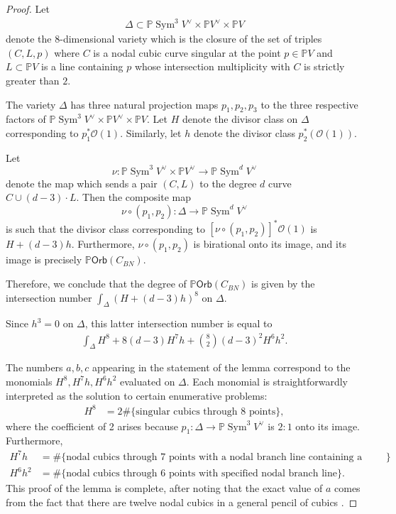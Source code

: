 \documentclass[12 pt, reqno]{amsart}
\theoremstyle{definition}
\newcommand{\on}{\operatorname}
\newcommand{\mb}{\mathbb}
\newcommand{\mc}{\mathcal}
\renewcommand{\P}{\mb{P}}
\newcommand{\Orb}{\mathsf{Orb}}
\begin{document}
\begin{proof} Let
  \begin{align}
    \label{Delta}
    \Delta \subset \P \on{Sym}^{3}V^{\vee} \times \P V^{\vee} \times \P V
  \end{align}
  denote the $8$-dimensional variety which is the closure of the set
  of triples $(C,L,p)$ where $C$ is a nodal cubic curve singular at
  the point $p \in \mb{P} V$ and $L \subset \P V$ is a line containing
  $p$ whose intersection multiplicity with $C$ is strictly greater
  than $2$.

  The variety $\Delta$ has three natural projection maps
  $p_{1}, p_{2}, p_{3}$ to the three respective factors of
  $\P \on{Sym}^{3}V^{\vee} \times \P V^{\vee} \times \P V$. Let $H$
  denote the divisor class on $\Delta$ corresponding to
  $p_{1}^{*}\mc{O}(1)$.  Similarly, let $h$ denote the divisor class
  $p_{2}^{*}(\mc{O}(1))$.

  Let
  \[\nu: \mb{P}\on{Sym}^{3}V^{\vee} \times \mb{P}V^{\vee} \to
    \mb{P}\on{Sym}^{d}V^{\vee}\] denote the map which sends a pair
  $(C,L)$ to the degree $d$ curve $C \cup (d-3) \cdot L$. Then the
  composite map
  \[\nu \circ (p_{1},p_{2}) : \Delta \to \P \on{Sym}^{d}V^{\vee}\] is
  such that the divisor class corresponding to
  $\left[\nu \circ (p_{1},p_{2})\right]^{*}\mc{O}(1)$ is $H +
  (d-3)h$. Furthermore, $\nu \circ (p_{1},p_{2})$ is birational onto
  its image, and its image is precisely $\P \Orb(C_{BN})$.

  Therefore, we conclude that the degree of $\P \Orb(C_{BN})$ is given
  by the intersection number $\int_{\Delta}(H+(d-3)h)^{8}$ on
  $\Delta$.

  Since $h^{3}=0$ on $\Delta$, this latter intersection number is
  equal to
\begin{align*}
  \int_{\Delta} H^{8} + 8(d-3)H^{7}h + {8 \choose 2}(d-3)^{2}H^{6}h^{2}.
\end{align*}

The numbers $a,b,c$ appearing in the statement of the lemma correspond
to the monomials $H^{8}, H^{7}h, H^{6}h^{2}$ evaluated on
$\Delta$. Each monomial is straightforwardly interpreted as the
solution to certain enumerative problems:
\begin{align*}
  H^{8}&=2\# \{\text{singular cubics through 8 points}\},
  \end{align*}
  where the coefficient of 2 arises because
  $p_{1}: \Delta \to \mb{P}\on{Sym}^{3}V^{\vee}$ is $2:1$ onto its
  image. Furthermore,
  \begin{align*}
    H^{7}h&=\# \{\text{nodal cubics through 7 points with a nodal branch line containing a fixed 8th point}\}\\
    H^{6}h^{2}&=\#\{\text{nodal cubics through 6 points with specified nodal branch line}\}.
\end{align*}
This proof of the lemma is complete, after noting that the exact value
of $a$ comes from the fact that there are twelve nodal cubics in a
general pencil of cubics \cite{W08}.
\end{proof}
\end{document}
